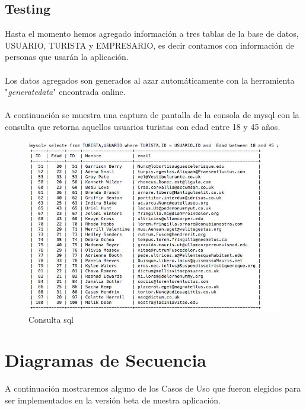 \documentclass[12pt]{article}
\begin{document}
\subsection{Testing}
Hasta el momento hemos agregado información a tres tablas de la base de datos, USUARIO, TURISTA y EMPRESARIO, es decir contamos con información de personas que usarán la aplicación.\\\\
Los datos agregados son generados al azar automáticamente con la herramienta "\emph{generatedata}" encontrada online.\\\\
A continuación se muestra una captura de pantalla de la consola de mysql con la consulta que retorna aquellos usuarios turistas con edad entre 18 y 45 años.\\
\begin{figure}[htp]
\centering
\includegraphics[scale=0.60]{Informe/bd2.jpg}
\caption{Consulta sql}
\label{}
\end{figure}
\section{Diagramas de Secuencia}
A continuación mostraremos alguno de los Casos de Uso que fueron elegidos para ser implementados en la versión beta de nuestra aplicación.
\newpage
\end{document}
